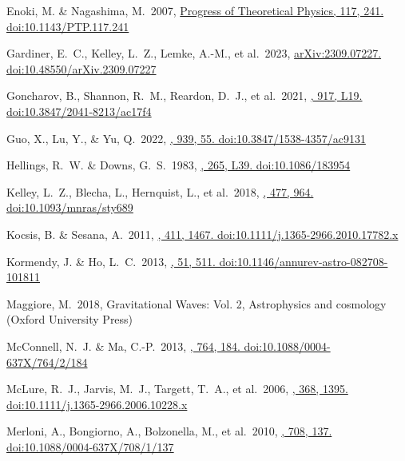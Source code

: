 \documentclass[twocolumn]{aastex631}
\begin{document}
\begin{thebibliography}{0}
Enoki, M. \& Nagashima, M.\ 2007, 
\href{https://ui.adsabs.harvard.edu/abs/2007PThPh.117..241E}
{Progress of Theoretical Physics, 117, 241. doi:10.1143/PTP.117.241}

Gardiner, E.~C., Kelley, L.~Z., Lemke, A.-M., et al.\ 2023, 
\href{https://ui.adsabs.harvard.edu/abs/2023arXiv230907227G}
{arXiv:2309.07227. doi:10.48550/arXiv.2309.07227}

Goncharov, B., Shannon, R.~M., Reardon, D.~J., et al.\ 2021, 
\href{https://ui.adsabs.harvard.edu/abs/2021ApJ...917L..19G}
{\apjl, 917, L19. doi:10.3847/2041-8213/ac17f4}

Guo, X., Lu, Y., \& Yu, Q.\ 2022, 
\href{https://ui.adsabs.harvard.edu/abs/2022ApJ...939...55G}
{\apj, 939, 55. doi:10.3847/1538-4357/ac9131}

Hellings, R.~W. \& Downs, G.~S.\ 1983, 
\href{https://ui.adsabs.harvard.edu/abs/1983ApJ...265L..39H}
{\apjl, 265, L39. doi:10.1086/183954}

Kelley, L.~Z., Blecha, L., Hernquist, L., et al.\ 2018, 
\href{https://ui.adsabs.harvard.edu/abs/2018MNRAS.477..964K}
{\mnras, 477, 964. doi:10.1093/mnras/sty689}

Kocsis, B. \& Sesana, A.\ 2011, 
\href{https://ui.adsabs.harvard.edu/abs/2011MNRAS.411.1467K}
{\mnras, 411, 1467. doi:10.1111/j.1365-2966.2010.17782.x}

Kormendy, J. \& Ho, L.~C.\ 2013, 
\href{https://ui.adsabs.harvard.edu/abs/2013ARA%26A..51..511K}
{\araa, 51, 511. doi:10.1146/annurev-astro-082708-101811}

Maggiore, M.\ 2018, 
{Gravitational Waves: Vol. 2, Astrophysics and cosmology (Oxford University Press)}

McConnell, N.~J. \& Ma, C.-P.\ 2013, 
\href{https://ui.adsabs.harvard.edu/abs/2013ApJ...764..184M}
{\apj, 764, 184. doi:10.1088/0004-637X/764/2/184}

McLure, R.~J., Jarvis, M.~J., Targett, T.~A., et al.\ 2006, 
\href{https://ui.adsabs.harvard.edu/abs/2006MNRAS.368.1395M}
{\mnras, 368, 1395. doi:10.1111/j.1365-2966.2006.10228.x}

Merloni, A., Bongiorno, A., Bolzonella, M., et al.\ 2010, 
\href{https://ui.adsabs.harvard.edu/abs/2010ApJ...708..137M}
{\apj, 708, 137. doi:10.1088/0004-637X/708/1/137}


\end{thebibliography}
\end{document}
